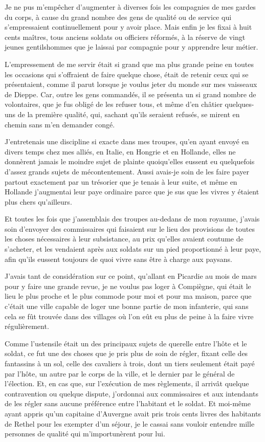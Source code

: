 \documentclass[french,twoside]{book} %
\begin{document}
Je ne pus m’empêcher d’augmenter à diverses fois les compagnies de mes gardes du corps, à cause du grand nombre des gens de qualité ou de service qui s’empressaient continuellement pour y avoir place. Mais enfin je les fixai à huit cents maîtres, tous anciens soldats ou officiers réformés, à la réserve de vingt jeunes gentilshommes que je laissai par compagnie pour y apprendre leur métier.\par
L’empressement de me servir était si grand que ma plus grande peine en toutes les occasions qui s’offraient de faire quelque chose, était de retenir ceux qui se présentaient, comme il parut lorsque je voulus jeter du monde sur mes vaisseaux de Dieppe. Car, outre les gens commandés, il se présenta un si grand nombre de volontaires, que je fus obligé de les refuser tous, et même d’en châtier quelques-uns de la première qualité, qui, sachant qu’ils seraient refusés, se mirent en chemin sans m’en demander congé.\par
J’entretenais une discipline si exacte dans mes troupes, qu’en ayant envoyé en divers temps chez mes alliés, en Italie, en Hongrie et en Hollande, elles ne donnèrent jamais le moindre sujet de plainte quoiqu’elles eussent eu quelquefois d’assez grands sujets de mécontentement. Aussi avais-je soin de les faire payer partout exactement par un trésorier que je tenais à leur suite, et même en Hollande j’augmentai leur paye ordinaire parce que je sus que les vivres y étaient plus chers qu’ailleurs.\par
Et toutes les fois que j’assemblais des troupes au-dedans de mon royaume, j’avais soin d’envoyer des commissaires qui faisaient sur le lieu des provisions de toutes les choses nécessaires à leur subsistance, au prix qu’elles avaient coutume de s’acheter, et les vendaient après aux soldats sur un pied proportionné à leur paye, afin qu’ils eussent toujours de quoi vivre sans être à charge aux paysans.\par
J’avais tant de considération sur ce point, qu’allant en Picardie au mois de mars pour y faire une grande revue, je ne voulus pas loger à Compiègne, qui était le lieu le plus proche et le plus commode pour moi et pour ma maison, parce que c’était une ville capable de loger une bonne partie de mon infanterie, qui sans cela se fût trouvée dans des villages où l’on eût eu plus de peine à la faire vivre régulièrement.\par
Comme l’ustensile était un des principaux sujets de querelle entre l’hôte et le soldat, ce fut une des choses que je pris plus de soin de régler, fixant celle des fantassins à un sol, celle des cavaliers à trois, dont un tiers seulement était payé par l’hôte, un autre par le corps de la ville, et le dernier par le général de l’élection. Et, en cas que, sur l’exécution de mes règlements, il arrivât quelque contravention ou quelque dispute, j’ordonnai aux commissaires et aux intendants de les régler sans aucune préférence entre l’habitant et le soldat. Et moi-même ayant appris qu’un capitaine d’Auvergne avait pris trois cents livres des habitants de Rethel pour les exempter d’un séjour, je le cassai sans vouloir entendre mille personnes de qualité qui m’importunèrent pour lui.\par
\end{document}
